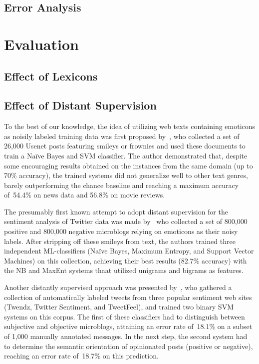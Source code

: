 \subsection{Error Analysis}

\section{Evaluation}
\subsection{Effect of Lexicons}\label{cgsa:subsec:eval:lexicons}


\subsection{Effect of Distant Supervision}
\todo[inline]{}

To the best of our knowledge, the idea of utilizing web texts
containing emoticons as noisily labeled training data was first
proposed by~\citet{Read:05}, who collected a set of 26,000 Usenet
posts featuring smileys or frownies and used these documents to train
a Na{\"i}ve Bayes and SVM classifier.  The author demonstrated that,
despite some encouraging results obtained on the instances from the
same domain (up to 70\% accuracy), the trained systems did not
generalize well to other text genres, barely outperforming the chance
baseline and reaching a maximum accuracy of~54.4\% on news data and
56.8\% on movie reviews.

The presumably first known attempt to adopt distant supervision for
the sentiment analysis of Twitter data was made by~\citet{Go:09} who
collected a set of 800,000 positive and 800,000 negative microblogs
relying on emoticons as their noisy labels.  After stripping off these
smileys from text, the authors trained three independent
ML-classifiers (Na{\"i}ve Bayes, Maximum Entropy, and Support Vector
Machines) on this collection, achieving their best results (82.7\%
accuracy) with the NB and MaxEnt systems thaat utilized unigrams and
bigrams as features.

Another distantly supervised approach was presented
by~\citet{Barbosa:10}, who gathered a collection of automatically
labeled tweets from three popular sentiment web sites (Twendz, Twitter
Sentiment, and TweetFeel), and trained two binary SVM systems on this
corpus.  The first of these classifiers had to distinguish between
subjective and objective microblogs, attaining an error rate of~18.1\%
on a subset of 1,000 manually annotated messages.  In the next step,
the second system had to determine the semantic orientation of
opinionated posts (positive or negative), reaching an error rate
of~18.7\% on this prediction.

